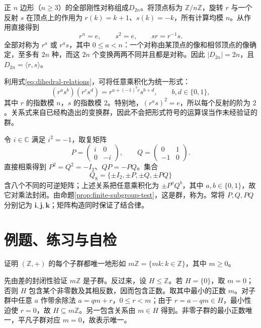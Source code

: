 \documentclass[UTF8,12pt,a4paper,fontset=fandol]{ctexbook}
\begin{document}
\begin{example}[二面体群]\label{ex:dihedral-group}
正 $n$ 边形（$n\geq3$）的全部刚性对称组成$D_{2n}$。将顶点标为 $\mathbb Z/n\mathbb Z$，旋转 $r$ 与一个反射 $s$ 在顶点上的作用为 $r(k)=k+1$、$s(k)=-k$，所有计算均模 $n$。从作用直接得到
\begin{equation}\label{eq:dihedral-relations}
  r^n=e,\qquad s^2=e,\qquad sr=r^{-1}s.
\end{equation}
全部对称为 $r^a$ 或 $r^as$，其中 $0\leq a<n$：一个对称由某顶点的像和相邻顶点的像确定，至多有 $2n$ 种，而这 $2n$ 个变换两两不同并且都是对称。因此 $|D_{2n}|=2n$，且 $D_{2n}=\langle r,s\rangle$。
\end{example}

利用式\eqref{eq:dihedral-relations}，可将任意乘积化为统一形式：
\begin{equation}\label{eq:dihedral-multiplication}
  (r^as^b)(r^cs^d)=r^{a+(-1)^bc}s^{b+d},
  \qquad b,d\in\{0,1\},
\end{equation}
其中 $r$ 的指数模 $n$，$s$ 的指数模 $2$。特别地，$(r^as)^2=e$，所以每个反射的阶为 $2$。关系式来自已经构造出的变换群，因此不会把形式符号的运算误当作未经验证的群。

\begin{example}[四元数群]\label{ex:quaternion-group}
令 $i\in\mathbb C$ 满足 $i^2=-1$，取复矩阵
\[
  P=\begin{pmatrix}i&0\\0&-i\end{pmatrix},\qquad
  Q=\begin{pmatrix}0&1\\-1&0\end{pmatrix}.
\]
直接相乘得到 $P^2=Q^2=-I_2$、$QP=-PQ$。集合
\[
  Q_8=\{\pm I_2,\pm P,\pm Q,\pm PQ\}
\]
含八个不同的可逆矩阵；上述关系把任意乘积化为 $\pm P^aQ^b$，其中 $a,b\in\{0,1\}$，故它对乘法封闭。由命题\ref{prop:finite-subgroup-test}，这是群，称为。常将 $P,Q,PQ$ 分别记为 $\boldsymbol i,\boldsymbol j,\boldsymbol k$；矩阵构造同时保证了结合律。
\end{example}

\section{例题、练习与自检}

\begin{example}[整数加法群的全部子群]\label{ex:integer-subgroups}
证明 $(\mathbb Z,+)$ 的每个子群都唯一地形如 $m\mathbb Z=\{mk:k\in\mathbb Z\}$，其中 $m\geq0$。
\end{example}
\begin{solve}
先由差的封闭性验证 $m\mathbb Z$ 是子群。反过来，设 $H\leq\mathbb Z$。若 $H=\{0\}$，取 $m=0$；否则 $H$ 包含某个非零数及其相反数，因而包含正数。取其中最小的正数 $m$。对子群中任意 $a$ 作带余除法 $a=qm+r$，$0\leq r<m$；由于 $r=a-qm\in H$，最小性迫使 $r=0$，故 $H\subseteq m\mathbb Z$。另一包含关系由 $m\in H$ 得到。非零子群的最小正数唯一，平凡子群对应 $m=0$，故表示唯一。
\end{solve}
\end{document}
